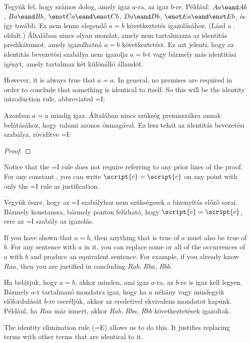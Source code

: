 Tegyük fel, hogy számos dolog, amely igaz  $a$-ra, az igaz $b$-re. Például: $Aa\eand Ab$, $Ba\eand Bb$, $\enot Ca\eand\enot Cb$, $Da\eand Db$, $\enot Ea\eand\enot Eb$, és így tovább. Ez nem lenne elegendő $a=b$ következtetés igazolásához. (Lásd a \pageref{model.nonidentity}. oldalt.) Általában nincs olyan mondat, amely nem tartalmazza az identitás predikátumot, amely igazolhatná $a=b$ következtetést. Ez azt jelenti, hogy az identitás bevezetési szabálya nem igazolja $a=b$-t vagy bármely más identitási igényt, amely tartalmaz két különálló állandót.

However, it is always true that $a=a$. In general, no premises are required in order to conclude that something is identical to itself. So this will be the identity introduction rule, abbreviated {=}I:

Azonban $a=a$ mindig igaz. Általában nincs szükség premisszákra annak belátásához, hogy valami azonos önmagával. Ez lesz tehát az identitás bevezetési szabálya, rövidítve {=}I:

\begin{proof}
	 
\end{proof}

Notice that the {=}I rule does not require referring to any prior lines of the proof. For any constant , you can write $\script{c}=\script{c}$ on any point with only the {=}I rule as justification.

Vegyük észre, hogy az {=}I szabályhoz nem szükségesek a bizonyítás előző sorai. Bármely  konstansra, bármely ponton felírható, hogy $\script{c}=\script{c}$, erre az {=}I szabály az igazolás.

If you have shown that $a=b$, then anything that is true of $a$ must also be true of $b$. For any sentence with $a$ in it, you can replace some or all of the occurrences of $a$ with $b$ and produce an equivalent sentence. For example, if you already know $Raa$, then you are justified in concluding $Rab$, $Rba$, $Rbb$.

Ha belátjuk, hogy $a=b$, akkor minden, ami igaz $a$-ra, az $b$-re is igaz kell legyen. Bármely $a$-t tartalmazó mondatra igaz, hogy ha $a$ néhány vagy mindegyik előfordulását $b$-re cseréljük, akkor az eredetivel ekvivalens mondatot kapunk. Például, ha $Raa$ már ismert, akkor $Rab$, $Rba$, $Rbb$ következtetések igazoltak.


The identity elimination rule ({=}E) allows us to do this. It justifies replacing terms with other terms that are identical to it.

